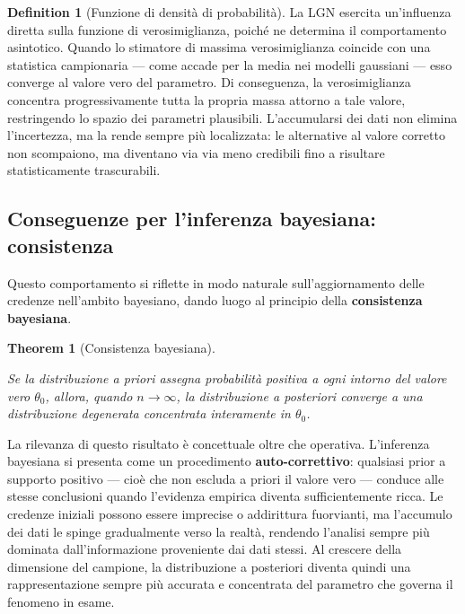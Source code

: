 \documentclass[
  letterpaper,
  DIV=11,
  numbers=noendperiod,
  oneside]{scrreprt}
\theoremstyle{definition}
\theoremstyle{plain}
\newtheorem{theorem}{Theorem}[chapter]
\theoremstyle{definition}
\newtheorem{definition}{Definition}[chapter]
\theoremstyle{remark}
\begin{document}
\begin{definition}[Funzione di densità di
probabilità]
La LGN esercita un'influenza diretta sulla funzione di verosimiglianza,
poiché ne determina il comportamento asintotico. Quando lo stimatore di
massima verosimiglianza coincide con una statistica campionaria --- come
accade per la media nei modelli gaussiani --- esso converge al valore
vero del parametro. Di conseguenza, la verosimiglianza concentra
progressivamente tutta la propria massa attorno a tale valore,
restringendo lo spazio dei parametri plausibili. L'accumularsi dei dati
non elimina l'incertezza, ma la rende sempre più localizzata: le
alternative al valore corretto non scompaiono, ma diventano via via meno
credibili fino a risultare statisticamente trascurabili.

\subsection{Conseguenze per l'inferenza bayesiana:
consistenza}\label{conseguenze-per-linferenza-bayesiana-consistenza}

Questo comportamento si riflette in modo naturale sull'aggiornamento
delle credenze nell'ambito bayesiano, dando luogo al principio della
\textbf{consistenza bayesiana}.

\begin{theorem}[Consistenza
bayesiana]\protect\hypertarget{thm-bayesian-consistency}{}\label{thm-bayesian-consistency}

Se la distribuzione a priori assegna probabilità positiva a ogni intorno
del valore vero \(\theta_0\), allora, quando \(n \to \infty\), la
distribuzione a posteriori converge a una distribuzione degenerata
concentrata interamente in \(\theta_0\).

\end{theorem}

La rilevanza di questo risultato è concettuale oltre che operativa.
L'inferenza bayesiana si presenta come un procedimento
\textbf{auto-correttivo}: qualsiasi prior a supporto positivo --- cioè
che non escluda a priori il valore vero --- conduce alle stesse
conclusioni quando l'evidenza empirica diventa sufficientemente ricca.
Le credenze iniziali possono essere imprecise o addirittura fuorvianti,
ma l'accumulo dei dati le spinge gradualmente verso la realtà, rendendo
l'analisi sempre più dominata dall'informazione proveniente dai dati
stessi. Al crescere della dimensione del campione, la distribuzione a
posteriori diventa quindi una rappresentazione sempre più accurata e
concentrata del parametro che governa il fenomeno in esame.


\end{definition}
\end{document}
